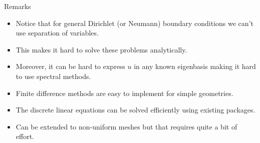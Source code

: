 \begin{frame}{Remarks}
	\begin{itemize}[<+->]
		\item Notice that for general Dirichlet (or Neumann) boundary conditions we can't use separation of variables. 
		\item This makes it hard to solve these problems analytically. 
		\item Moreover, it can be hard to express $ u $ in any known eigenbasis making it hard to use \alert{spectral methods}.
		\item Finite difference methods are easy to implement for simple geometries.
		\item The discrete linear equations can be solved efficiently using existing packages. 
		\item Can be extended to non-uniform meshes but that requires quite a bit of effort.
	\end{itemize}
\end{frame}


